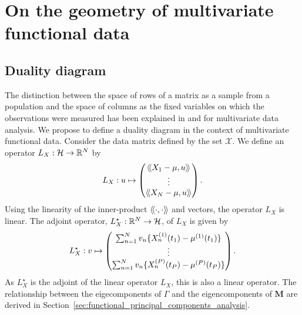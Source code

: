 \section{On the geometry of multivariate functional data} %
\label{sec:geometric_point_of_view_mfpca}

\subsection{Duality diagram} %
\label{sub:duality_diagram}

The distinction between the space of rows of a matrix as a sample from a population and the space of columns as the fixed variables on which the observations were measured has been explained in \cite{holmesMultivariateDataAnalysis2008} and \cite{delacruzDualityDiagramData2011} for multivariate data analysis. We propose to define a duality diagram in the context of multivariate functional data. Consider the data matrix defined by the set $\mathcal{X}$. We define an operator $L_X : \mathcal{H} \rightarrow \mathbb{R}^N$ by
\begin{equation}
    L_X: u \mapsto \begin{pmatrix}
        \langle\!\langle X_1 - \mu, u\rangle\!\rangle \\
        \vdots \\
        \langle\!\langle X_N - \mu, u\rangle\!\rangle
    \end{pmatrix}.
\end{equation}
Using the linearity of the inner-product $\langle\!\langle\cdot, \cdot\rangle\!\rangle$ and vectors, the operator $L_X$ is linear. The adjoint operator, $L^\star_X : \mathbb{R}^N \rightarrow \mathcal{H}$, of $L_X$ is given by
\begin{equation}
    L^\star_X: v \mapsto \begin{pmatrix}
       \sum_{n = 1}^N v_n \{X_n^{(1)}(t_1) - \mu^{(1)}(t_1)\} \\ 
       \vdots \\ 
       \sum_{n = 1}^N v_n \{X_n^{(P)}(t_P) - \mu^{(P)}(t_P)\}
    \end{pmatrix}.
\end{equation}
As $L^\star_X$ is the adjoint of the linear operator $L_X$, this is also a linear operator.  The relationship between the eigecomponents of $\Gamma$ and the eigencomponents of $\mathbf{M}$ are derived in Section~\ref{sec:functional_principal_components_analysis}.
